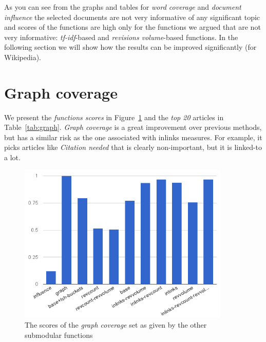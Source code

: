 As you can see from the graphs and tables for \emph{word coverage} and
\emph{document influence} the selected documents are not very informative of
any significant topic and scores of the functions are high only for the
functions we argued that are not very informative: \emph{tf-idf}-based and
\emph{revisions volume}-based functions.
In the following section we will show how the results can be improved
significantly (for Wikipedia).

\section{Graph coverage}

We present the \emph{functions scores} in Figure~\ref{img:graph} and the
\emph{top 20} articles in Table~\ref{tab:graph}.
\emph{Graph coverage} is a great improvement over previous methods, but has a
similar risk as the one associated with inlinks measures. For example, it picks
articles like \emph{Citation needed} that is clearly non-important, but it is
linked-to a lot.

\begin{figure}
  \centering
  \includegraphics[width=0.9\textwidth,natwidth=555,natheight=419]{images/graph.png}
  \caption{The scores of the \emph{graph coverage} set as given by the other
  submodular functions}
  \label{img:graph}
\end{figure}

